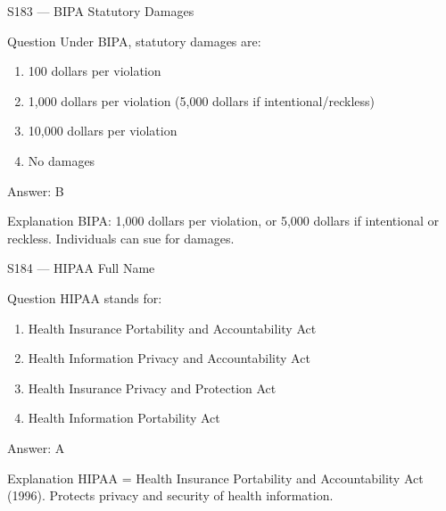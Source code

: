 \documentclass[aspectratio=169,8pt]{beamer}
\begin{document}
	\begin{frame}{S183 --- BIPA Statutory Damages}
		\begin{block}{Question}
			Under BIPA, statutory damages are:
			\begin{enumerate}
				\item 100 dollars per violation
				\item 1,000 dollars per violation (5,000 dollars if intentional/reckless)
				\item 10,000 dollars per violation
				\item No damages
			\end{enumerate}
		\end{block}
		\begin{exampleblock}{Answer: B}\end{exampleblock}
		\begin{block}{Explanation}
			BIPA: 1,000 dollars per violation, or 5,000 dollars if intentional or reckless. Individuals can sue for damages.
		\end{block}
	\end{frame}
	
	\begin{frame}{S184 --- HIPAA Full Name}
		\begin{block}{Question}
			HIPAA stands for:
			\begin{enumerate}
				\item Health Insurance Portability and Accountability Act
				\item Health Information Privacy and Accountability Act
				\item Health Insurance Privacy and Protection Act
				\item Health Information Portability Act
			\end{enumerate}
		\end{block}
		\begin{exampleblock}{Answer: A}\end{exampleblock}
		\begin{block}{Explanation}
			HIPAA = Health Insurance Portability and Accountability Act (1996). Protects privacy and security of health information.
		\end{block}
	\end{frame}
	
\end{document}
